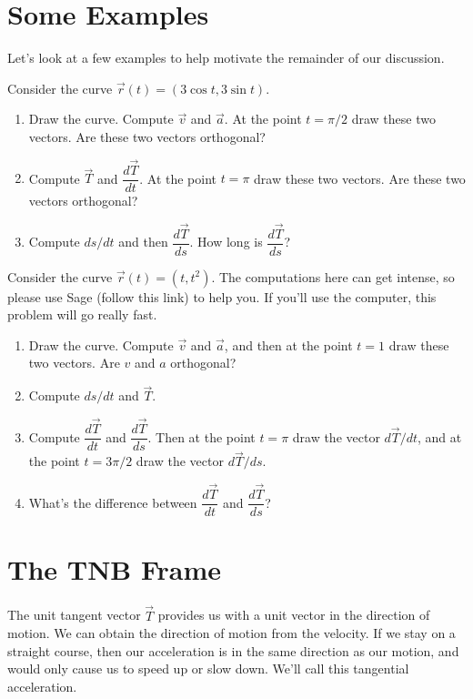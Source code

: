 \section{Some Examples}

Let's look at a few examples to help motivate the remainder of our discussion.
\begin{problem}
 Consider the curve $\vec r(t) = (3\cos t, 3\sin t)$.
\begin{enumerate}
 \item Draw the curve. Compute $\vec v$ and $\vec a$. At the point $t=\pi/2$ draw these two vectors. Are these two vectors orthogonal? 
 \item Compute $\vec T$ and $\dfrac{d\vec T}{dt}$. At the point $t=\pi$ draw these two vectors. Are these two vectors orthogonal? 
 \item Compute $ds/dt$ and then $\dfrac{d\vec T}{ds}$. How long is $\dfrac{d\vec T}{ds}$?  
\end{enumerate}
\end{problem}

\begin{problem}
 Consider the curve $\vec r(t) = (t, t^2)$. The computations here can get intense, so please use Sage (follow this link) to help you. If you'll use the computer, this problem will go really fast.  
\begin{enumerate}
 \item Draw the curve. Compute $\vec v$ and $\vec a$, and then at the point $t=1$ draw these two vectors. Are $v$ and $a$ orthogonal?
 \item Compute $ds/dt$ and $\vec T$. 
 \item Compute $\dfrac{d\vec T}{dt}$ and $\dfrac{d\vec T}{ds}$. Then at the point $t=\pi$ draw the vector $d\vec T/dt$, and at the point $t=3\pi/2$ draw the vector $d\vec T/ds$.
 \item What's the difference between $\dfrac{d\vec T}{dt}$ and $\dfrac{d\vec T}{ds}$?
\end{enumerate}
\end{problem}




\section{The TNB Frame}
The unit tangent vector $\vec T$ provides us with a unit vector in the direction of motion. We can obtain the direction of motion from the velocity. If we stay on a straight course, then our acceleration is in the same direction as our motion, and would only cause us to speed up or slow down. We'll call this tangential acceleration.

